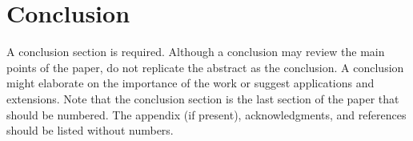 \section{Conclusion}

A conclusion section is required. Although a conclusion may review the main points of the paper, do not replicate the abstract as the conclusion. A conclusion might elaborate on the importance of the work or suggest applications and extensions. Note that the conclusion section is the last section of the paper that should be numbered. The appendix (if present), acknowledgments, and references should be listed without numbers.